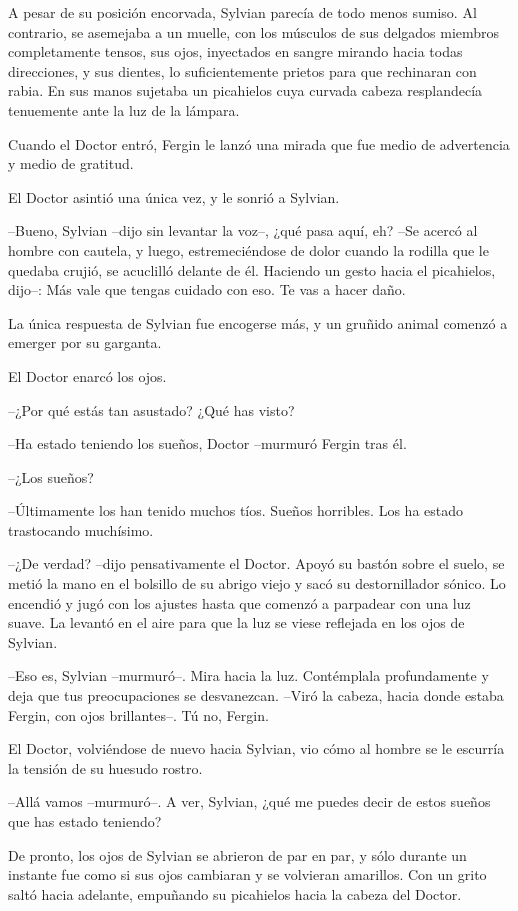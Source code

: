 A pesar de su posición encorvada, Sylvian parecía de todo menos sumiso. Al contrario, se asemejaba a un muelle, con los músculos de sus delgados miembros completamente tensos, sus ojos, inyectados en sangre mirando hacia todas direcciones, y sus dientes, lo suficientemente prietos para que rechinaran con rabia. En sus manos sujetaba un picahielos cuya curvada cabeza resplandecía tenuemente ante la luz de la lámpara.

Cuando el Doctor entró, Fergin le lanzó una mirada que fue medio de advertencia y medio de gratitud.

El Doctor asintió una única vez, y le sonrió a Sylvian.

--Bueno, Sylvian --dijo sin levantar la voz--, ¿qué pasa aquí, eh? --Se acercó al hombre con cautela, y luego, estremeciéndose de dolor cuando la rodilla que le quedaba crujió, se acuclilló delante de él. Haciendo un gesto hacia el picahielos, dijo--: Más vale que tengas cuidado con eso. Te vas a hacer daño.

La única respuesta de Sylvian fue encogerse más, y un gruñido animal comenzó a emerger por su garganta.

El Doctor enarcó los ojos.

--¿Por qué estás tan asustado? ¿Qué has visto?

--Ha estado teniendo los sueños, Doctor --murmuró Fergin tras él.

--¿Los sueños?

--Últimamente los han tenido muchos tíos. Sueños horribles. Los ha estado trastocando muchísimo.

--¿De verdad? --dijo pensativamente el Doctor. Apoyó su bastón sobre el suelo, se metió la mano en el bolsillo de su abrigo viejo y sacó su destornillador sónico. Lo encendió y jugó con los ajustes hasta que comenzó a parpadear con una luz suave. La levantó en el aire para que la luz se viese reflejada en los ojos de Sylvian.

--Eso es, Sylvian --murmuró--. Mira hacia la luz. Contémplala profundamente y deja que tus preocupaciones se desvanezcan. --Viró la cabeza, hacia donde estaba Fergin, con ojos brillantes--. Tú no, Fergin.

El Doctor, volviéndose de nuevo hacia Sylvian, vio cómo al hombre se le escurría la tensión de su huesudo rostro. 

--Allá vamos --murmuró--. A ver, Sylvian, ¿qué me puedes decir de estos sueños que has estado teniendo?

De pronto, los ojos de Sylvian se abrieron de par en par, y sólo durante un instante fue como si sus ojos cambiaran y se volvieran amarillos. Con un grito saltó hacia adelante, empuñando su picahielos hacia la cabeza del Doctor.

